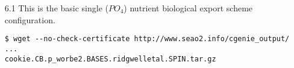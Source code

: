 \begin{itemize}[noitemsep]
\vspace{2mm}
\item [6.1] This is the basic single (\(PO_{4}\)) nutrient biological export scheme configuration.
\vspace{-1mm}\small\begin{verbatim}
$ wget --no-check-certificate http://www.seao2.info/cgenie_output/ ...
cookie.CB.p_worbe2.BASES.ridgwelletal.SPIN.tar.gz
\end{verbatim}\normalsize\vspace{-1mm}
\end{itemize}


